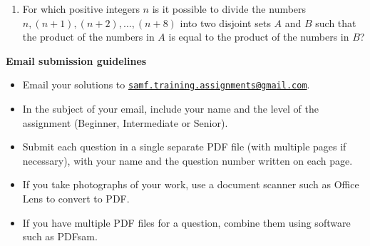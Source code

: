 \documentclass{article}
\begin{document}
\begin{enumerate}[1.]
\bigskip
\item  %
For which positive integers $n$ is it possible to divide the numbers $n, (n + 1), (n + 2), \dots, (n + 8)$ into two disjoint sets $A$ and $B$ such that the product of the numbers in $A$ is equal to the product of the numbers in $B$?

\end{enumerate}


\vfill
\textbf{\Large Email submission guidelines}
\begin{itemize}
	\item Email your solutions to \href{mailto:samf.training.assignments@gmail.com}{\texttt{samf.training.assignments@gmail.com}}.
	\item In the subject of your email, include your name and the level of the assignment (Beginner, Intermediate or Senior).
	\item Submit each question in a single separate PDF file (with multiple pages if necessary), with your name and the question number written on each page.
	\item If you take photographs of your work, use a document scanner such as Office Lens to convert to PDF.
	\item If you have multiple PDF files for a question, combine them using software such as PDFsam.
\end{itemize}
\end{document}
